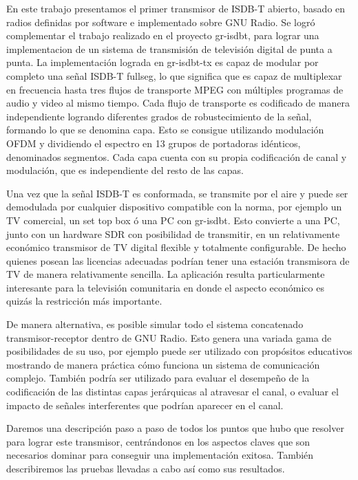 En este trabajo presentamos el primer transmisor de ISDB-T abierto, basado en radios definidas por software e implementado sobre GNU Radio. Se logró complementar el trabajo realizado en el proyecto gr-isdbt, para lograr una implementacion de un sistema de transmisión de televisión digital de punta a punta. La implementación lograda en gr-isdbt-tx \cite{gr-isdbt-tx} es capaz de modular por completo una señal ISDB-T fullseg, lo que significa que es capaz de multiplexar en frecuencia hasta tres flujos de transporte MPEG con múltiples programas de audio y video al mismo tiempo. Cada flujo de transporte es codificado de manera independiente logrando diferentes grados de robustecimiento de la señal, formando lo que se denomina capa. Esto se consigue utilizando modulación OFDM y dividiendo el espectro en 13 grupos de portadoras idénticos, denominados segmentos. Cada capa cuenta con su propia codificación de canal y modulación, que es independiente del resto de las capas.

Una vez que la señal ISDB-T es conformada, se transmite por el aire y puede ser demodulada por cualquier dispositivo compatible con la norma, por ejemplo un TV comercial, un set top box ó una PC con gr-isdbt. Esto convierte a una PC, junto con un hardware SDR con posibilidad de transmitir, en un relativamente económico transmisor de TV digital flexible y totalmente configurable. De hecho quienes posean las licencias adecuadas podrían tener una estación transmisora de TV de manera relativamente sencilla. La aplicación resulta particularmente interesante para la televisión comunitaria en donde el aspecto económico es quizás la restricción más importante.

De manera alternativa, es posible simular todo el sistema concatenado transmisor-receptor dentro de GNU Radio. Esto genera una variada gama de posibilidades de su uso, por ejemplo puede ser utilizado con propósitos educativos mostrando de manera práctica cómo funciona un sistema de comunicación complejo. También podría ser utilizado para evaluar el desempeño de la codificación de las distintas capas jerárquicas al atravesar el canal, o evaluar el impacto de señales interferentes que podrían aparecer en el canal. 

Daremos una descripción paso a paso de todos los puntos que hubo que resolver para lograr este transmisor, centrándonos en los aspectos claves que son necesarios dominar para conseguir una implementación exitosa. También describiremos las pruebas llevadas a cabo así como sus resultados. 